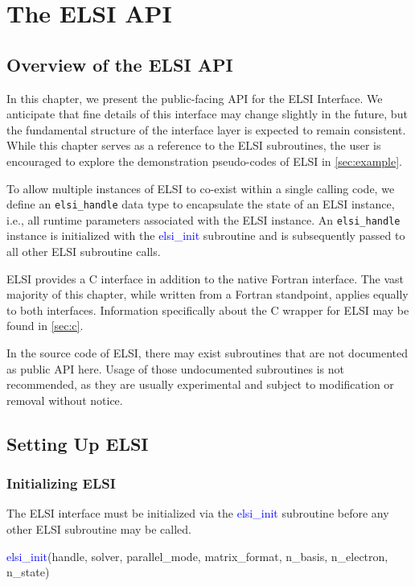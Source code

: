 \documentclass{report}
\newcommand{\tcb}[1]{\textcolor{blue}{#1}}
\begin{document}
\chapter{The ELSI API}
\section{Overview of the ELSI API}
\label{sec:api}
In this chapter, we present the public-facing API for the ELSI Interface. We anticipate that fine details of this interface may change slightly in the future, but the fundamental structure of the interface layer is expected to remain consistent. While this chapter serves as a reference to the ELSI subroutines, the user is encouraged to explore the demonstration pseudo-codes of ELSI in \ref{sec:example}.

To allow multiple instances of ELSI to co-exist within a single calling code, we define an \texttt{elsi\_handle} data type to encapsulate the state of an ELSI instance, i.e., all runtime parameters associated with the ELSI instance. An \texttt{elsi\_handle} instance is initialized with the \tcb{elsi\_init} subroutine and is subsequently passed to all other ELSI subroutine calls.

ELSI provides a C interface in addition to the native Fortran interface. The vast majority of this chapter, while written from a Fortran standpoint, applies equally to both interfaces. Information specifically about the C wrapper for ELSI may be found in \ref{sec:c}.

In the source code of ELSI, there may exist subroutines that are not documented as public API here. Usage of those undocumented subroutines is not recommended, as they are usually experimental and subject to modification or removal without notice.

\section{Setting Up ELSI}
\label{sec:setup}
\subsection{Initializing ELSI}
\label{subsec:setup_init}
The ELSI interface must be initialized via the \tcb{elsi\_init} subroutine before any other ELSI subroutine may be called.
\begin{labeling}{\hspace{6cm}}
\item [\hspace{0.3cm} \tcb{elsi\_init}(handle, solver, parallel\_mode, matrix\_format, n\_basis, n\_electron, n\_state)]
\end{labeling}
\end{document}
